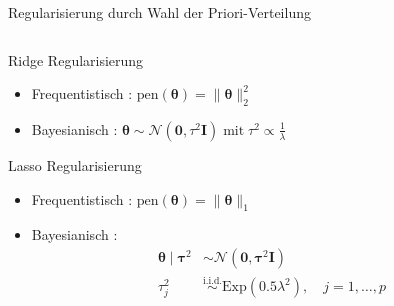 \documentclass[
  ignorenonframetext,
  aspectratio=169,
]{beamer}
\newcommand{\bnull}{\bm{0}}
\newcommand{\bI}{\bm{I}}
\newcommand{\Ncal}{\mathcal{N}}
\newcommand{\btheta}{\bm{\theta}}
\newcommand{\btaus}{\bm{\tau}^2}
\newcommand{\taus}{\tau^2}
\begin{document}
\begin{frame}{Regularisierung durch Wahl der Priori-Verteilung}
\protect{}\label{regularisierung-durch-wahl-der-priori-verteilung}
\begin{columns}[T]
\begin{column}{0.55\linewidth}
\begin{block}{Ridge Regularisierung}
\protect{}\label{ridge-regularisierung}
\begin{itemize}
\item
  Frequentistisch \autocite{hoerl_ridge_1970,hoerl_ridge_1970-1}:
  \(\text{pen}(\btheta) = \|\btheta\|_2^2\)
\item
  Bayesianisch \autocite{mackay_bayesian_1992}:
  \(\btheta \sim \Ncal(\bnull, \taus \bI) \; \text{mit} \; \taus \propto \frac{1}{\lambda}\)
\end{itemize}
\end{block}

\begin{block}{Lasso Regularisierung}
\protect{}\label{lasso-regularisierung}
\begin{itemize}
\item
  Frequentistisch \autocite{tibshirani_regression_1996}:
  \(\text{pen}(\btheta) = \|\btheta\|_1\)
\item
  Bayesianisch \autocite{park_bayesian_2008}: \[
  \begin{aligned}
  \btheta \mid \btaus &\sim \Ncal(\bnull, \btaus \bI) \\
  \taus_j &\overset{\text{i.i.d.}}{\sim} \text{Exp}(0.5 \lambda^2), \quad j = 1, \dots, p
  \end{aligned}
  \]
\end{itemize}
\end{block}
\end{column}


\end{columns}
\end{frame}
\end{document}
